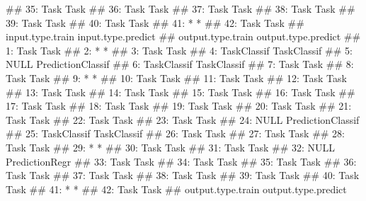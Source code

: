\documentclass[]{article}
\newenvironment{Shaded}{}{}
\newcommand{\NormalTok}[1]{#1}
\renewenvironment{Shaded} {\begin{snugshade}\small} {\end{snugshade}}
\begin{document}
\begin{Shaded}
\begin{Highlighting}[]
\NormalTok{## 35:             Task               Task}
\NormalTok{## 36:             Task               Task}
\NormalTok{## 37:             Task               Task}
\NormalTok{## 38:             Task               Task}
\NormalTok{## 39:             Task               Task}
\NormalTok{## 40:             Task               Task}
\NormalTok{## 41:                *                  *}
\NormalTok{## 42:             Task               Task}
\NormalTok{##     input.type.train input.type.predict}
\NormalTok{##     output.type.train output.type.predict}
\NormalTok{##  1:              Task                Task}
\NormalTok{##  2:                 *                   *}
\NormalTok{##  3:              Task                Task}
\NormalTok{##  4:       TaskClassif         TaskClassif}
\NormalTok{##  5:              NULL   PredictionClassif}
\NormalTok{##  6:       TaskClassif         TaskClassif}
\NormalTok{##  7:              Task                Task}
\NormalTok{##  8:              Task                Task}
\NormalTok{##  9:                 *                   *}
\NormalTok{## 10:              Task                Task}
\NormalTok{## 11:              Task                Task}
\NormalTok{## 12:              Task                Task}
\NormalTok{## 13:              Task                Task}
\NormalTok{## 14:              Task                Task}
\NormalTok{## 15:              Task                Task}
\NormalTok{## 16:              Task                Task}
\NormalTok{## 17:              Task                Task}
\NormalTok{## 18:              Task                Task}
\NormalTok{## 19:              Task                Task}
\NormalTok{## 20:              Task                Task}
\NormalTok{## 21:              Task                Task}
\NormalTok{## 22:              Task                Task}
\NormalTok{## 23:              Task                Task}
\NormalTok{## 24:              NULL   PredictionClassif}
\NormalTok{## 25:       TaskClassif         TaskClassif}
\NormalTok{## 26:              Task                Task}
\NormalTok{## 27:              Task                Task}
\NormalTok{## 28:              Task                Task}
\NormalTok{## 29:                 *                   *}
\NormalTok{## 30:              Task                Task}
\NormalTok{## 31:              Task                Task}
\NormalTok{## 32:              NULL      PredictionRegr}
\NormalTok{## 33:              Task                Task}
\NormalTok{## 34:              Task                Task}
\NormalTok{## 35:              Task                Task}
\NormalTok{## 36:              Task                Task}
\NormalTok{## 37:              Task                Task}
\NormalTok{## 38:              Task                Task}
\NormalTok{## 39:              Task                Task}
\NormalTok{## 40:              Task                Task}
\NormalTok{## 41:                 *                   *}
\NormalTok{## 42:              Task                Task}
\NormalTok{##     output.type.train output.type.predict}
\end{Highlighting}
\end{Shaded}
\end{document}
